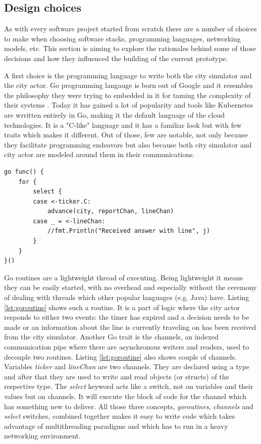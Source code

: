 \documentclass[conference]{IEEEtran}
\begin{document}
\subsection{Design choices}
\label{subsec:designchoices}

As with every software project started from scratch there are a number of choices to make when choosing software stacks, programming languages, networking models, etc. This section is aiming to explore the rationales behind some of those decisions and how they influenced the building of the current prototype.

A first choice is the programming language to write both the city simulator and the city actor. Go programming langauge is born out of Google and it resembles the philosophy they were trying to embedded in it for taming the complexity of their systems \cite{donovan2015go}. Today it has gained a lot of popularity and tools like Kubernetes are wrritten entirely in Go, making it the default language of the cloud technologies. It is a "C-like" language and it has a familiar look but with few traits which makes it different. Out of those, few are notable, not only because they facilitate programming endeavors but also because both city simulator and city actor are modeled around them in their communications. 

\begin{lstlisting}[caption=Go routine from city actor, label=lst:goroutine]
go func() {
	for {
		select {
		case <-ticker.C:
			advance(city, reportChan, lineChan)
		case _ = <-lineChan:
			//fmt.Println("Received answer with line", j)
		}
	}
}()
\end{lstlisting}

Go routines are a lightweight thread of executing. Being lightweight it means they can be easily started, with no overhead and especially without the ceremony of dealing with threads which other popular languages (e.g. Java) have. Listing \ref{lst:goroutine} shows such a routine. It is a part of logic where the city actor responds to either two events: the timer has expired and a decision needs to be made or an information about the line is currently traveling on has been received from the city simulator. Another Go trait is the channels, an indexed communication pipe where there are asynchronous writers and readers, used to decouple two routines. Listing \ref{lst:goroutine} also shows couple of channels. Variables \textit{ticker} and \textit{lineChan} are two channels. They are declared using a type and after that they are used to write and read objects (or structs) of the respective type. The \textit{select} keyword acts like a switch, not on variables and their values but on channels. It will execute the block of code for the channel which has something new to deliver. All those three concepts, \textit{goroutines}, \textit{channels} and \textit{select} switches, combined together makes it easy to write code which takes advantage of multithreading paradigms and which has to run in a heavy networking environment.
\end{document}
